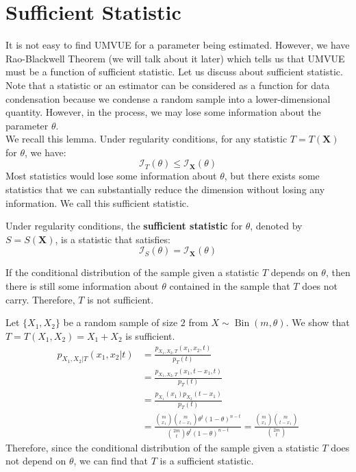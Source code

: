 \documentclass{huhtakm-template-book-v2}
\DeclareMathOperator{\Bin}{Bin}
\begin{document}
\section{Sufficient Statistic}
It is not easy to find UMVUE for a parameter being estimated. However, we have Rao-Blackwell Theorem (we will talk about it later) which tells us that UMVUE must be a function of sufficient statistic. Let us discuss about sufficient statistic.\\
Note that a statistic or an estimator can be considered as a function for data condensation because we condense a random sample into a lower-dimensional quantity. However, in the process, we may lose some information about the parameter $\theta$.\\
We recall this lemma. Under regularity conditions, for any statistic $T=T(\mathbf{X})$ for $\theta$, we have:
\begin{equation*}
	\mathcal{I}_{T}(\theta)\leq\mathcal{I}_{\mathbf{X}}(\theta)
\end{equation*}
Most statistics would lose some information about $\theta$, but there exists some statistics that we can substantially reduce the dimension without losing any information. We call this sufficient statistic.
\begin{defn}
	Under regularity conditions, the \textbf{sufficient statistic} for $\theta$, denoted by $S=S(\mathbf{X})$, is a statistic that satisfies:
	\begin{equation*}
		\mathcal{I}_{S}(\theta)=\mathcal{I}_{\mathbf{X}}(\theta)
	\end{equation*}
\end{defn}
\begin{rem}
	If the conditional distribution of the sample given a statistic $T$ depends on $\theta$, then there is still some information about $\theta$ contained in the sample that $T$ does not carry. Therefore, $T$ is not sufficient.
\end{rem}
\begin{eg}
	Let $\{X_{1},X_{2}\}$ be a random sample of size $2$ from $X\sim\Bin(m,\theta)$. We show that $T=T(X_{1},X_{2})=X_{1}+X_{2}$ is sufficient.
	\begin{align*}
		p_{X_{1},X_{2}|T}(x_{1},x_{2}|t)&=\frac{p_{X_{1},X_{2},T}(x_{1},x_{2},t)}{p_{T}(t)}\\
		&=\frac{p_{X_{1},X_{2},T}(x_{1},t-x_{1},t)}{p_{T}(t)}\\
		&=\frac{p_{X_{1}}(x_{1})p_{X_{2}}(t-x_{1})}{p_{T}(t)}\\
		&=\frac{\binom{m}{x_{1}}\binom{m}{t-x_{1}}\theta^{t}(1-\theta)^{n-t}}{\binom{2m}{t}\theta^{t}(1-\theta)^{n-t}}=\frac{\binom{m}{x_{1}}\binom{m}{t-x_{1}}}{\binom{2m}{t}}
	\end{align*}
	Therefore, since the conditional distribution of the sample given a statistic $T$ does not depend on $\theta$, we can find that $T$ is a sufficient statistic.
\end{eg}
\end{document}
